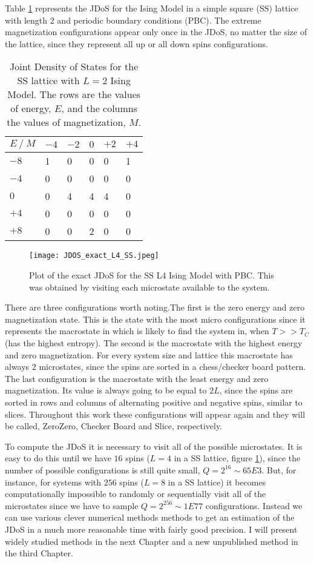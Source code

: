 Table \ref{exact_L2} represents the JDoS for the Ising Model in a simple square (SS) lattice with length $2$ and periodic boundary conditions (PBC). The extreme magnetization configurations appear only once in the JDoS, no matter the size of the lattice, since they represent all up or all down spins configurations. 

\begin{table}[h]
\centering
\caption{Joint Density of States for the SS lattice with $L=2$ Ising Model. The rows are the values of energy, $E$, and the columns the values of magnetization, $M$.}
\label{exact_L2}
\begin{tabular}{l|lllll}
$E \ / \ M$ & $-4$ & $-2$ &  $0$ & $+2$ &  $+4$ \\ \hline
$-8$  & 1  & 0  & 0 & 0 & 1 \\
$-4$  & 0  & 0  & 0 & 0 & 0 \\
$0$   & 0  & 4  & 4 & 4 & 0 \\
$+4$   & 0  & 0  & 0 & 0 & 0 \\
$+8$   & 0  & 0  & 2 & 0 & 0
\end{tabular}
\end{table}

\begin{figure}[h]
	\centering
	\texttt{[image: JDOS\_exact\_L4\_SS.jpeg]}
	\caption{Plot of the exact JDoS for the SS L4 Ising Model with PBC. This was obtained by visiting each microstate available to the system.}
	\label{exact_L4}
\end{figure}

\pagebreak

There are three configurations worth noting.The first is the zero energy and zero magnetization state. This is the state with the most micro configurations since it represents the macrostate in which is likely to find the system in, when $T>>T_C$(has the highest entropy). The second is the macrostate with the highest energy and zero magnetization. For every system size and lattice this macrostate has always $2$ microstates, since the spins are sorted in a chess/checker board pattern. The last configuration is the macrostate with the least energy and zero magnetization. Its value is always going to be equal to $2L$, since the spins are sorted in rows and columns of alternating positive and negative spins, similar to slices. Throughout this work these configurations will appear again and they will be called, ZeroZero, Checker Board and Slice, respectively. 

To compute the JDoS it is necessary to visit all of the possible microstates. It is easy to do this until we have $16$ spins ($L=4$ in a SS lattice, figure \ref{exact_L4}), since the number of possible configurations is still quite small, $Q = 2^{16}\sim 65E3$. But, for instance, for systems with $256$ spins ($L=8$ in a SS lattice) it becomes computationally impossible to randomly or sequentially visit all of the microstates since we have to sample $Q = 2^{256} \sim 1E77$ configurations. 
Instead we can use various clever numerical methods methods to get an estimation of the JDoS in a much more reasonable time with fairly good precision. I will present widely studied methods in the next Chapter and a new unpublished method in the third Chapter.

